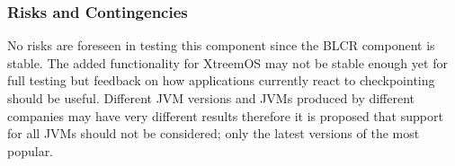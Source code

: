 \subsubsection{Risks and Contingencies}
No risks are foreseen in testing this component since the BLCR component is stable. The added functionality for XtreemOS may not be stable enough yet for full testing but feedback on how applications currently react to checkpointing should be useful.
Different JVM versions and JVMs produced by different companies may have very different results therefore it is proposed that support for all JVMs should not be considered; only the latest versions of the most popular.

